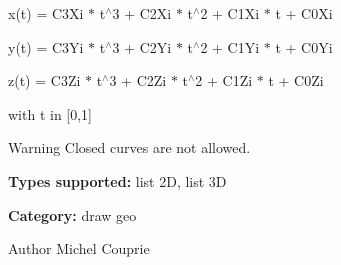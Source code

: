 x(t) = C3Xi $\ast$ t$^\wedge$3 + C2Xi $\ast$ t$^\wedge$2 + C1Xi $\ast$ t + C0Xi\par
 y(t) = C3Yi $\ast$ t$^\wedge$3 + C2Yi $\ast$ t$^\wedge$2 + C1Yi $\ast$ t + C0Yi\par
 z(t) = C3Zi $\ast$ t$^\wedge$3 + C2Zi $\ast$ t$^\wedge$2 + C1Zi $\ast$ t + C0Zi\par
 with t in [0,1]

\begin{DoxyWarning}{Warning}
Closed curves are not allowed.
\end{DoxyWarning}
{\bfseries Types supported:} list 2D, list 3D

{\bfseries Category:} draw geo

\begin{DoxyAuthor}{Author}
Michel Couprie 
\end{DoxyAuthor}
